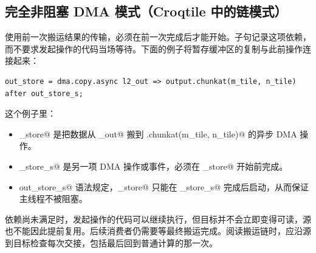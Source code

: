\subsection*{完全非阻塞 DMA 模式（Croqtile 中的链模式）}

使用前一次搬运结果的传输，必须在前一次完成后才能开始。\co@after@ 子句记录这项依赖，而不要求发起操作的代码当场等待。下面的例子将暂存缓冲区的复制与此前操作连接起来：

\begin{lstlisting}[language=croqtile,caption={完全非阻塞 DMA 模式（Croqtile 中的链模式）}]
out_store = dma.copy.async l2_out => output.chunkat(m_tile, n_tile) after out_store_s;
\end{lstlisting}

这个例子里：

\begin{itemize}[leftmargin=1.6em]
\item \co@out_store@ 是把数据从 _out@ 搬到 \co@output.chunkat(m_tile, n_tile)@ 的异步 DMA 操作。
\item \co@out_store_s@ 是另一项 DMA 操作或事件，必须在 \co@out_store@ 开始前完成。
\item \co@after out_store_s@ 语法规定，\co@out_store@ 只能在 \co@out_store_s@ 完成后启动，从而保证主线程不被阻塞。
\end{itemize}

依赖尚未满足时，发起操作的代码可以继续执行，但目标并不会立即变得可读，源也不能因此提前复用。后续消费者仍需要等最终搬运完成。阅读搬运链时，应沿源到目标检查每次交接，包括最后回到普通计算的那一次。

